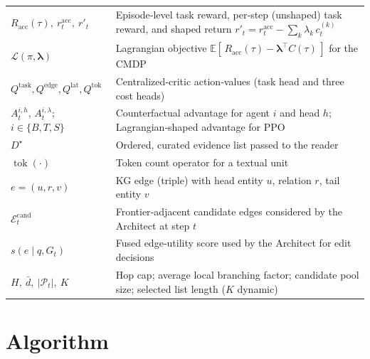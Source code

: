 \documentclass{article} %
\begin{document}
\begin{table}[H]
\begin{tabularx}{\textwidth}{@{}lL@{}}
$R_{\mathrm{acc}}(\tau),\ r^{\mathrm{acc}}_t,\ r'_t$ & Episode‑level task reward, per‑step (unshaped) task reward, and shaped return $r'_t=r^{\mathrm{acc}}_t-\sum_{k}\lambda_k\,c_t^{(k)}$ \\
$\mathcal{L}(\pi,\boldsymbol{\lambda})$ & Lagrangian objective $\mathbb{E}[\,R_{\mathrm{acc}}(\tau)-\boldsymbol{\lambda}^{\top}C(\tau)\,]$ for the CMDP \\
$Q^{\text{task}},Q^{\text{edge}},Q^{\text{lat}},Q^{\text{tok}}$ & Centralized‑critic action‑values (task head and three cost heads) \\
$A^{i,h}_t$, $A^{i,\lambda}_t$; $i\in\{B,T,S\}$ & Counterfactual advantage for agent $i$ and head $h$; Lagrangian‑shaped advantage for PPO \\
$D^\star$ & Ordered, curated evidence list passed to the reader \\
$\operatorname{tok}(\cdot)$ & Token count operator for a textual unit \\
$e=(u,r,v)$ & KG edge (triple) with head entity $u$, relation $r$, tail entity $v$ \\
$\mathcal{E}^{\mathrm{cand}}_t$ & Frontier‑adjacent candidate edges considered by the Architect at step $t$ \\
$s(e\mid q,G_t)$ & Fused edge‑utility score used by the Architect for edit decisions \\
$H,\ \bar d,\ |\mathcal{P}_t|,\ K$ & Hop cap; average local branching factor; candidate pool size; selected list length ($K$ dynamic) \\
\bottomrule
\end{tabularx}
\end{table}


\newpage

\section{Algorithm}
\label{appendix:algs}
\end{document}
